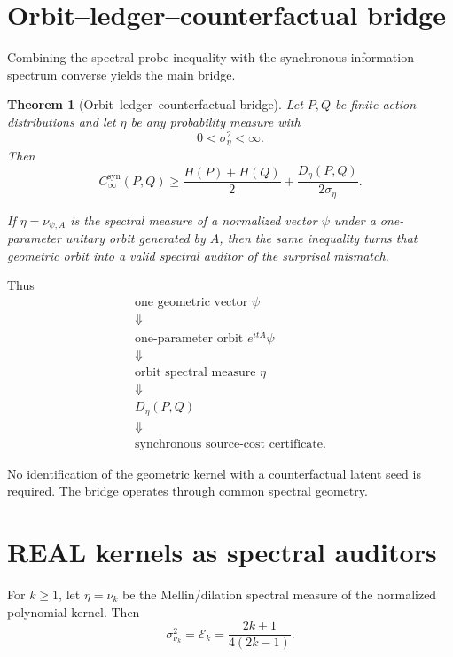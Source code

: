 \documentclass[11pt,a4paper]{article}
\newtheorem{theorem}{Theorem}[section]
\newcommand{\CinfSyn}{C_{\infty}^{\mathrm{syn}}}
\newcommand{\1}{\mathbf 1}
\begin{document}
\section{Orbit--ledger--counterfactual bridge}

Combining the spectral probe inequality with the synchronous
information-spectrum converse yields the main bridge.

\begin{theorem}[Orbit--ledger--counterfactual bridge]
Let \(P,Q\) be finite action distributions and let \(\eta\) be any
probability measure with
\[
0<\sigma_\eta^2<\infty.
\]
Then
\[
\boxed{
\CinfSyn(P,Q)
\ge
\frac{H(P)+H(Q)}2
+
\frac{D_\eta(P,Q)}{2\sigma_\eta}.
}
\tag{37.1}
\]

If \(\eta=\nu_{\psi,A}\) is the spectral measure of a normalized vector
\(\psi\) under a one-parameter unitary orbit generated by \(A\), then the
same inequality turns that geometric orbit into a valid spectral auditor
of the surprisal mismatch.
\end{theorem}

Thus
\[
\boxed{
\begin{gathered}
\text{one geometric vector }\psi
\\
\Downarrow
\\
\text{one-parameter orbit }e^{itA}\psi
\\
\Downarrow
\\
\text{orbit spectral measure }\eta
\\
\Downarrow
\\
D_\eta(P,Q)
\\
\Downarrow
\\
\text{synchronous source-cost certificate}.
\end{gathered}
}
\tag{37.2}
\]

No identification of the geometric kernel with a counterfactual latent
seed is required.
The bridge operates through common spectral geometry.


\section{REAL kernels as spectral auditors}

For \(k\ge1\), let \(\eta=\nu_k\) be the Mellin/dilation spectral measure
of the normalized polynomial kernel.
Then
\[
\sigma_{\nu_k}^2
=
\mathcal E_k
=
\frac{2k+1}{4(2k-1)}.
\]
\end{document}
